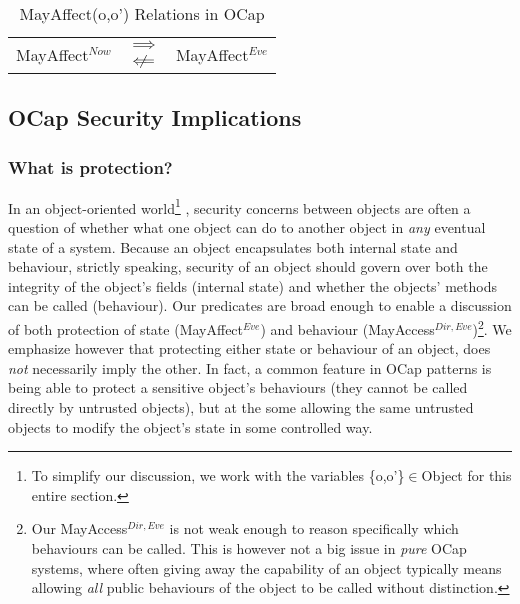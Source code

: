 \documentclass[a4paper,11pt, twoside,twocolumn]{article}
\newcommand{\loin}{$\in$}
\newcommand{\loimplies}{$\implies$}
\newcommand{\lonimpliedby}{$\centernot\Longleftarrow$}
\begin{document}
\begin{table}[hbtp]
\caption{MayAffect(o,o') Relations in OCap}
\centering
\begin{tabular*}{\linewidth}{ccc}\toprule
\multirow{2}{*}{MayAffect$^{Now}$} & \loimplies & \multirow{2}{*}{MayAffect$^{Eve}$} \\
& \lonimpliedby &  \\
\bottomrule
\end{tabular*}
\end{table}

\subsection{OCap Security Implications}


\subsubsection{What is protection?}
In an object-oriented world\footnote{
To simplify our discussion, we work with the variables \{o,o'\}\loin Object for this entire section.}
, security concerns between objects are often a question of whether what one object can do to another object in \textit{any} eventual state of a system. Because an object encapsulates both internal state and behaviour, strictly speaking, security of an object should govern over both the integrity of the object's fields (internal state) and whether the objects' methods can be called (behaviour). Our predicates are broad enough to enable a discussion of both protection of state (MayAffect$^{Eve}$) and behaviour (MayAccess$^{Dir,Eve}$)\footnote{ Our MayAccess$^{Dir,Eve}$ is not weak enough to reason specifically which behaviours can be called. This is however not a big issue in \textit{pure} OCap systems, where often giving away the capability of an object typically means allowing \textit{all} public behaviours of the object to be called without distinction.}. We emphasize however that protecting either state or behaviour of an object, does \textit{not} necessarily imply the other. In fact, a common feature in OCap patterns is being able to protect a sensitive object's behaviours (they cannot be called directly by untrusted objects), but at the some allowing the same untrusted objects to modify the object's state in some controlled way.\\
\end{document}
